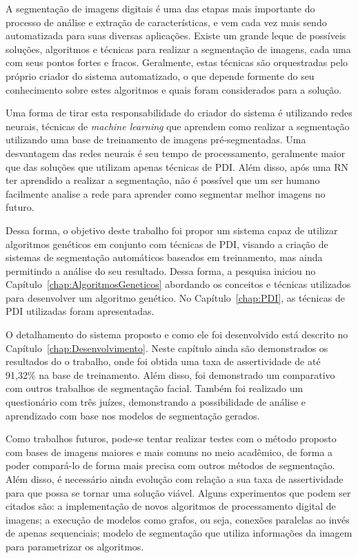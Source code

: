 \documentclass[12pt,oneside,a4paper,english,french,spanish,brazil,]{abntex2}
\begin{document}
A segmentação de imagens digitais é uma das etapas mais importante do processo de análise e extração de características, e vem cada vez mais sendo automatizada para suas diversas aplicações. Existe um grande leque de possíveis soluções, algoritmos e técnicas para realizar a segmentação de imagens, cada uma com seus pontos fortes e fracos. Geralmente, estas técnicas são orquestradas pelo próprio criador do sistema automatizado, o que depende formente do seu conhecimento sobre estes algoritmos e quais foram considerados para a solução.

Uma forma de tirar esta responsabilidade do criador do sistema é utilizando redes neurais, técnicas de \textit{machine learning} que aprendem como realizar a segmentação utilizando uma base de treinamento de imagens pré-segmentadas. Uma desvantagem das redes neurais é seu tempo de processamento, geralmente maior que das soluções que utilizam apenas técnicas de PDI. Além disso, após uma RN ter aprendido a realizar a segmentação, não é possível que um ser humano facilmente analise a rede para aprender como segmentar melhor imagens no futuro.

Dessa forma, o objetivo deste trabalho foi propor um sistema capaz de utilizar algoritmos genéticos em conjunto com técnicas de PDI, visando a criação de sistemas de segmentação automáticos baseados em treinamento, mas ainda permitindo a análise do seu resultado. Dessa forma, a pesquisa iniciou no Capítulo~\ref{chap:AlgoritmosGeneticos} abordando os conceitos e técnicas utilizados para desenvolver um algoritmo genético. No Capítulo~\ref{chap:PDI}, as técnicas de PDI utilizadas foram apresentadas.

O detalhamento do sistema proposto e como ele foi desenvolvido está descrito no Capítulo~\ref{chap:Desenvolvimento}. Neste capítulo ainda são demonstrados os resultados do o trabalho, onde foi obtida uma taxa de assertividade de até 91,32\% na base de treinamento. Além disso, foi demonstrado um comparativo com outros trabalhos de segmentação facial. Também foi realizado um questionário com três juízes, demonstrando a possibilidade de análise e aprendizado com base nos modelos de segmentação gerados.

Como trabalhos futuros, pode-se tentar realizar testes com o método proposto com bases de imagens maiores e mais comuns no meio acadêmico, de forma a poder compará-lo de forma mais precisa com outros métodos de segmentação.  Além disso, é necessário ainda evolução com relação a sua taxa de assertividade para que possa se tornar uma solução viável. Alguns experimentos que podem ser citados são: a implementação de novos algoritmos de processamento digital de imagens; a execução de modelos como grafos, ou seja, conexões paralelas ao invés de apenas sequenciais; modelo de segmentação que utiliza informações da imagem para parametrizar os algoritmos.
\end{document}
